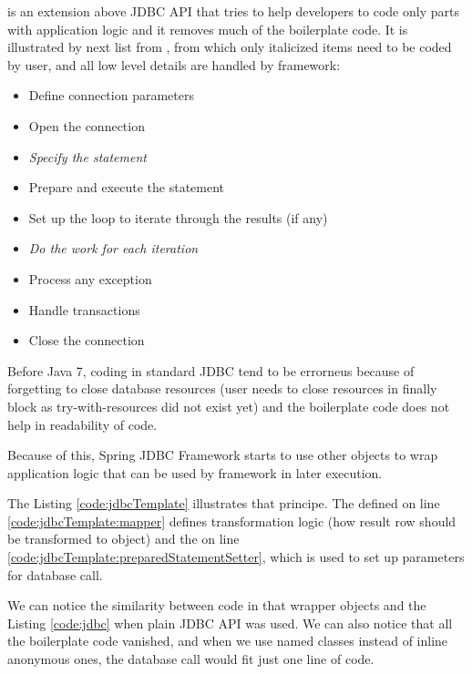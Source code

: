 \citet{SpringJDBC} is an extension above JDBC API that tries to help developers to code only
parts with application logic and it removes much of the boilerplate code.
It is illustrated by next list from \citet{SpringJDBC}, from which only
italicized items need to be coded by user, and all low level details
are handled by framework:
\begin{itemize}
  \item Define connection parameters
  \item Open the connection
  \item \textit{Specify the statement}
  \item Prepare and execute the statement
  \item Set up the loop to iterate through the results (if any)
  \item \textit{Do the work for each iteration}
  \item Process any exception
  \item Handle transactions
  \item Close the connection   
\end{itemize}

Before Java 7, coding in standard JDBC tend to be errorneus because of forgetting to close
database resources (user needs to close resources in finally block as try-with-resources did not exist yet)
and the boilerplate code does not help in readability of code.

Because of this, Spring JDBC Framework starts to use other objects
to wrap application logic that can be used by framework in later execution.

The Listing \ref{code:jdbcTemplate} illustrates that principe.
The  defined on line \ref{code:jdbcTemplate:mapper} defines transformation
logic (how result row should be transformed to\break
{} object)
and the  on line \ref{code:jdbcTemplate:preparedStatementSetter},
which is used to set up parameters for database call.

We can notice the similarity between code in that wrapper objects and the Listing
\ref{code:jdbc} when plain JDBC API was used. We can also notice that all the boilerplate code vanished,
and when we use named classes instead of inline anonymous ones, the database call would fit just one line of code.







